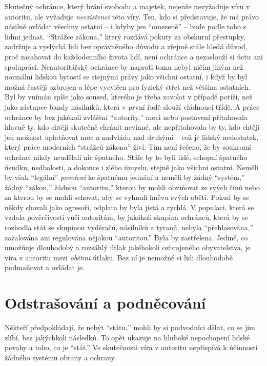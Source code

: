 \documentclass{book}
\begin{document}
Skutečný ochránce, který brání svobodu a majetek, nejenže nevyžaduje víru v autoritu, ale vyžaduje \emph{neexistenci} této víry. Ten, kdo si představuje, že má právo násilně ovládat všechny ostatní -- i kdyby jen \enquote{omezeně} -- bude podle toho s lidmi jednat. \enquote{Strážce zákona,} který rozdává pokuty za obskurní přestupky, zadržuje a vyslýchá lidi bez oprávněného důvodu a zřejmě stále hledá důvod, proč zasahovat do každodenního života lidí, není ochránce a nezaslouží si úctu ani spolupráci. Neautoritářský ochránce by naproti tomu nebyl ničím jiným než normální lidskou bytostí se stejnými právy jako všichni ostatní, i když by byl možná častěji ozbrojen a lépe vycvičen pro fyzický střet než většina ostatních. Byl by vnímán spíše jako soused, kterého je třeba zavolat v případě potíží, než jako zástupce bandy násilníků, která v první řadě slouží vládnoucí třídě. A práce ochránce by bez jakékoli zvláštní \enquote{autority,} moci nebo postavení přitahovala hlavně ty, kdo chtějí skutečně chránit nevinné, ale nepřitahovala by ty, kdo chtějí jen možnost uplatňovat moc a nadvládu nad druhými -- což je lidský nedostatek, který práce moderních \enquote{strážců zákona} živí. Tím není řečeno, že by soukromí ochránci nikdy neudělali nic špatného. Stále by to byli lidé, schopní špatného úsudku, nedbalosti, a dokonce i zlého úmyslu, stejně jako všichni ostatní. Neměli by však \enquote{legální} \emph{povolení} ke špatnému jednání a neměli by žádný \enquote{systém,} žádný \enquote{zákon,} žádnou \enquote{autoritu,} kterou by mohli obviňovat ze svých činů nebo za kterou by se mohli schovat, aby se vyhnuli hněvu svých obětí. Pokud by se někdy chovali jako agresoři, odplata by byla jistá a rychlá. V populaci, která se vzdala pověrčivosti vůči autoritám, by jakákoli skupina ochránců, která by se rozhodla stát se skupinou vyděračů, násilníků a tyranů, nebyla \enquote{přehlasována,} zažalována ani regulována nějakou \enquote{autoritou.} Byla by zastřelena. Jediné, co umožňuje dlouhodobý a rozsáhlý útlak jakéhokoli ozbrojeného obyvatelstva, je víra v autoritu mezi \emph{obětmi} útlaku. Bez ní je nemožné si lidi dlouhodobě podmaňovat a ovládat je.

\section{Odstrašování a podněcování}

Někteří předpokládají, že nebýt \enquote{státu,} mohli by si podvodníci dělat, co se jim zlíbí, bez jakýchkoli následků. To opět ukazuje na hluboké nepochopení lidské povahy a toho, co je \enquote{stát.} Ve skutečnosti víra v autoritu nepřispívá k účinnosti žádného systému obrany a ochrany.
\end{document}
